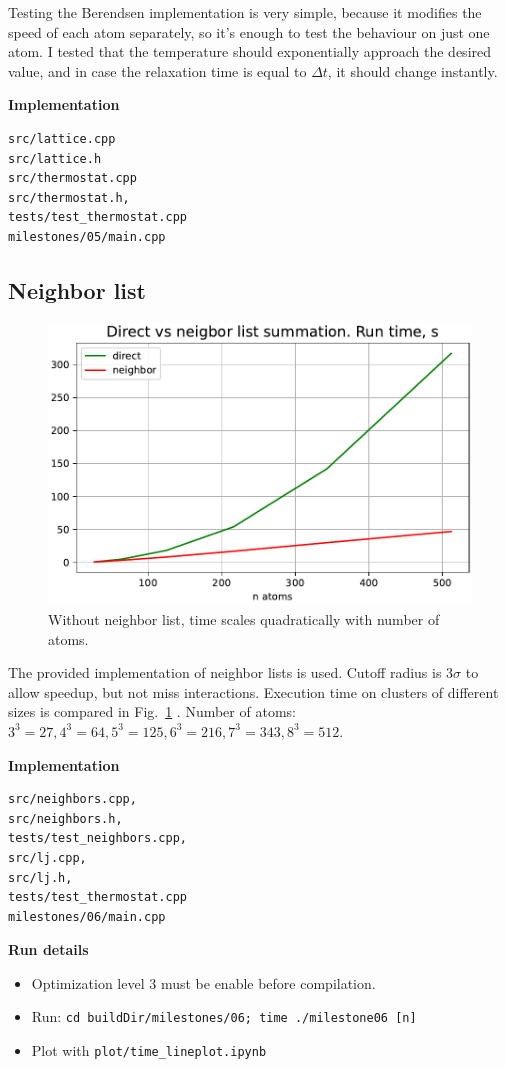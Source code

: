 \documentclass[12pt,a4paper]{article}
\begin{document}
Testing the Berendsen implementation is very simple, because it modifies the speed of each atom separately, so it's enough to test the behaviour on just one atom. I tested that the temperature should exponentially approach the desired value, and in case the relaxation time is equal to \(\Delta t\), it should change instantly.

{\bf Implementation}
\begin{lstlisting}[breaklines]
src/lattice.cpp
src/lattice.h
src/thermostat.cpp
src/thermostat.h,
tests/test_thermostat.cpp
milestones/05/main.cpp
\end{lstlisting}


\subsection*{Neighbor list}

\begin{figure}[htb]
	\centering
	\includegraphics[width=.8\linewidth]{img/milestone06-time.pdf}
	\caption{Without neighbor list, time scales quadratically with number of atoms.}
	\label{fig:neighbor}
\end{figure}

The provided implementation of neighbor lists is used. Cutoff radius is \( 3 \sigma \) to allow speedup, but not miss interactions. Execution time on clusters of different sizes is compared in Fig.~\ref{fig:neighbor} . Number of atoms: $3^3=27, 4^3=64, 5^3=125, 6^3=216, 7^3=343, 8^3=512$.

{\bf Implementation}
\begin{lstlisting}[breaklines]
src/neighbors.cpp,
src/neighbors.h,
tests/test_neighbors.cpp,
src/lj.cpp,
src/lj.h,
tests/test_thermostat.cpp
milestones/06/main.cpp
\end{lstlisting}

{\bf Run details}
\begin{itemize}
	\item Optimization level 3 must be enable before compilation.
	\item Run: \verb|cd buildDir/milestones/06; time ./milestone06 [n]|
	\item Plot with \verb|plot/time_lineplot.ipynb|
\end{itemize}
\end{document}
